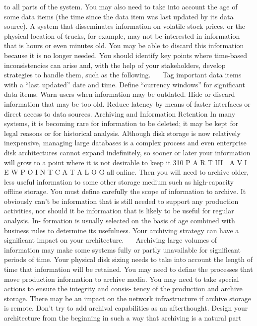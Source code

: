 to all parts of the system.
You may also need to take into account the age of some data items (the
time since the data item was last updated by its data source). A system that
disseminates information on volatile stock prices, or the physical location of
trucks, for example, may not be interested in information that is hours or
even minutes old. You may be able to discard this information because it is no
longer needed.
You should identify key points where time-based inconsistencies can
arise and, with the help of your stakeholders, develop strategies to handle
them, such as the following.
Tag important data items with a “last updated” date and time.
Define “currency windows” for significant data items.
Warn users when information may be outdated.
Hide or discard information that may be too old.
Reduce latency by means of faster interfaces or direct access to data
sources.
Archiving and Information Retention
In many systems, it is becoming rare for information to be deleted; it may be
kept for legal reasons or for historical analysis. Although disk storage is now
relatively inexpensive, managing large databases is a complex process and
even enterprise disk architectures cannot expand indefinitely, so sooner or
later your information will grow to a point where it is not desirable to keep it
310
 P A R T III  A V I E W P O I N T C A T A L O G
all online. Then you will need to archive older, less useful information to
some other storage medium such as high-capacity offline storage.
You must define carefully the scope of information to archive. It obviously
can’t be information that is still needed to support any production activities,
nor should it be information that is likely to be useful for regular analysis. In-
formation is usually selected on the basis of age combined with business
rules to determine its usefulness.
Your archiving strategy can have a significant impact on your architecture.
Archiving large volumes of information may make some systems fully or
partly unavailable for significant periods of time.
Your physical disk sizing needs to take into account the length of time
that information will be retained.
You may need to define the processes that move production information
to archive media.
You may need to take special actions to ensure the integrity and consis-
tency of the production and archive storage.
There may be an impact on the network infrastructure if archive storage
is remote.
Don’t try to add archival capabilities as an afterthought. Design your
architecture from the beginning in such a way that archiving is a natural part

